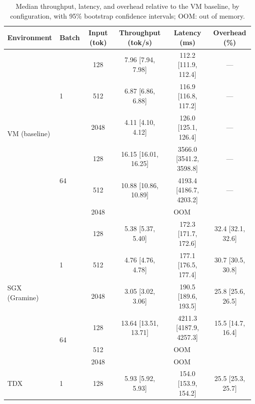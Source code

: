\documentclass[sigconf]{acmart}
\begin{document}
\begin{table}[b]
  \caption{Median throughput, latency, and overhead relative to the VM baseline, by
  configuration, with 95\% bootstrap confidence intervals; OOM: out of memory.}
  \label{tab:overhead}
  \small
  \begin{tabular}{llcccc}
    \toprule
    \textbf{Environment} & \textbf{Batch} & \textbf{Input (tok)} & \textbf{Throughput (tok/s)} & \textbf{Latency (ms)} & \textbf{Overhead (\%)} \\
    \midrule
    \multirow{6}{*}{VM (baseline)} & \multirow{3}{*}{1}  & 128  & 7.96 [7.94, 7.98]   & 112.2 [111.9, 112.4]   & --- \\
                                    &                     & 512  & 6.87 [6.86, 6.88]   & 116.9 [116.8, 117.2]   & --- \\
                                    &                     & 2048 & 4.11 [4.10, 4.12]   & 126.0 [125.1, 126.4]   & --- \\
                                    & \multirow{3}{*}{64} & 128  & 16.15 [16.01, 16.25] & 3566.0 [3541.2, 3598.8] & --- \\
                                    &                     & 512  & 10.88 [10.86, 10.89] & 4193.4 [4186.7, 4203.2] & --- \\
                                    &                     & 2048 & \multicolumn{3}{c}{OOM} \\
    \midrule
    \multirow{6}{*}{SGX (Gramine)}  & \multirow{3}{*}{1}  & 128  & 5.38 [5.37, 5.40]   & 172.3 [171.7, 172.6]   & 32.4 [32.1, 32.6] \\
                                    &                     & 512  & 4.76 [4.76, 4.78]   & 177.1 [176.5, 177.4]   & 30.7 [30.5, 30.8] \\
                                    &                     & 2048 & 3.05 [3.02, 3.06]   & 190.5 [189.6, 193.5]   & 25.8 [25.6, 26.5] \\
                                    & \multirow{3}{*}{64} & 128  & 13.64 [13.51, 13.71] & 4211.3 [4187.9, 4257.3] & 15.5 [14.7, 16.4] \\
                                    &                     & 512  & \multicolumn{3}{c}{OOM} \\
                                    &                     & 2048 & \multicolumn{3}{c}{OOM} \\
    \midrule
    \multirow{6}{*}{TDX}            & \multirow{3}{*}{1}  & 128  & 5.93 [5.92, 5.93]   & 154.0 [153.9, 154.2]   & 25.5 [25.3, 25.7] \\

\end{tabular}
\end{table}
\end{document}
